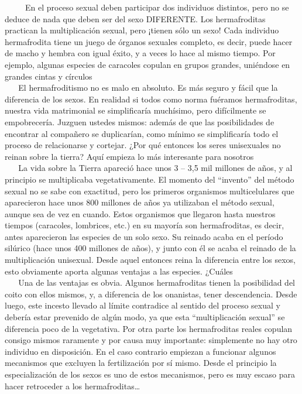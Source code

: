 ~ ~ ~ En el proceso sexual deben participar dos individuos distintos,
pero no se deduce de nada que deben ser del sexo DIFERENTE. Los
hermafroditas practican la multiplicación sexual, pero ¡tienen sólo un
sexo! Cada individuo hermafrodita tiene un juego de órganos sexuales
completo, es decir, puede hacer de macho y hembra con igual éxito, y a
veces lo hace al mismo tiempo. Por ejemplo, algunas especies de
caracoles copulan en grupos grandes, uniéndose en grandes cintas y
círculos\\
\hspace*{0.333em} ~ ~ El hermafroditismo no es malo en absoluto. Es más
seguro y fácil que la diferencia de los sexos. En realidad si todos como
norma fuéramos hermafroditas, nuestra vida matrimonial se simplificaría
muchísimo, pero difícilmente se empobrecería. Juzguen ustedes mismos:
además de que las posibilidades de encontrar al compañero se
duplicarían, como mínimo se simplificaría todo el proceso de
relacionarse y cortejar. ¿Por qué entonces los seres unisexuales no
reinan sobre la tierra? Aquí empieza lo más interesante para nosotros\\
\hspace*{0.333em} ~ ~ La vida sobre la Tierra apareció hace unos 3 --
3,5 mil millones de años, y al principio se multiplicaba
vegetativamente. El momento del ``invento'' del método sexual no se sabe
con exactitud, pero los primeros organismos multicelulares que
aparecieron hace unos 800 millones de años ya utilizaban el método
sexual, aunque sea de vez en cuando. Estos organismos que llegaron hasta
nuestros tiempos (caracoles, lombrices, etc.) en su mayoría son
hermafroditas, es decir, antes aparecieron las especies de un solo sexo.
Su reinado acaba en el período silúrico (hace unos 400 millones de
años), y junto con él se acaba el reinado de la multiplicación
unisexual. Desde aquel entonces reina la diferencia entre los sexos,
esto obviamente aporta algunas ventajas a las especies. ¿Cuáles\\
\hspace*{0.333em} ~ ~ Una de las ventajas es obvia. Algunos
hermafroditas tienen la posibilidad del coito con ellos mismos, y, a
diferencia de los onanistas, tener descendencia. Desde luego, este
incesto llevado al límite contradice al sentido del proceso sexual y
debería estar prevenido de algún modo, ya que esta ``multiplicación
sexual'' se diferencia poco de la vegetativa. Por otra parte los
hermafroditas reales copulan consigo mismos raramente y por causa muy
importante: simplemente no hay otro individuo en disposición. En el caso
contrario empiezan a funcionar algunos mecanismos que excluyen la
fertilización por sí mismo. Desde el principio la especialización de los
sexos es uno de estos mecanismos, pero es muy escaso para hacer
retroceder a los hermafroditas\ldots{}

